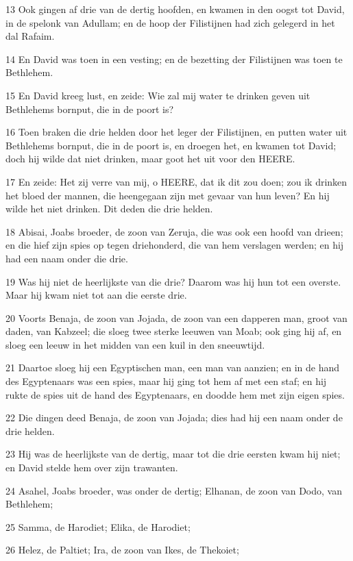 \par 13 Ook gingen af drie van de dertig hoofden, en kwamen in den oogst tot David, in de spelonk van Adullam; en de hoop der Filistijnen had zich gelegerd in het dal Rafaim.
\par 14 En David was toen in een vesting; en de bezetting der Filistijnen was toen te Bethlehem.
\par 15 En David kreeg lust, en zeide: Wie zal mij water te drinken geven uit Bethlehems bornput, die in de poort is?
\par 16 Toen braken die drie helden door het leger der Filistijnen, en putten water uit Bethlehems bornput, die in de poort is, en droegen het, en kwamen tot David; doch hij wilde dat niet drinken, maar goot het uit voor den HEERE.
\par 17 En zeide: Het zij verre van mij, o HEERE, dat ik dit zou doen; zou ik drinken het bloed der mannen, die heengegaan zijn met gevaar van hun leven? En hij wilde het niet drinken. Dit deden die drie helden.
\par 18 Abisai, Joabs broeder, de zoon van Zeruja, die was ook een hoofd van drieen; en die hief zijn spies op tegen driehonderd, die van hem verslagen werden; en hij had een naam onder die drie.
\par 19 Was hij niet de heerlijkste van die drie? Daarom was hij hun tot een overste. Maar hij kwam niet tot aan die eerste drie.
\par 20 Voorts Benaja, de zoon van Jojada, de zoon van een dapperen man, groot van daden, van Kabzeel; die sloeg twee sterke leeuwen van Moab; ook ging hij af, en sloeg een leeuw in het midden van een kuil in den sneeuwtijd.
\par 21 Daartoe sloeg hij een Egyptischen man, een man van aanzien; en in de hand des Egyptenaars was een spies, maar hij ging tot hem af met een staf; en hij rukte de spies uit de hand des Egyptenaars, en doodde hem met zijn eigen spies.
\par 22 Die dingen deed Benaja, de zoon van Jojada; dies had hij een naam onder de drie helden.
\par 23 Hij was de heerlijkste van de dertig, maar tot die drie eersten kwam hij niet; en David stelde hem over zijn trawanten.
\par 24 Asahel, Joabs broeder, was onder de dertig; Elhanan, de zoon van Dodo, van Bethlehem;
\par 25 Samma, de Harodiet; Elika, de Harodiet;
\par 26 Helez, de Paltiet; Ira, de zoon van Ikes, de Thekoiet;
